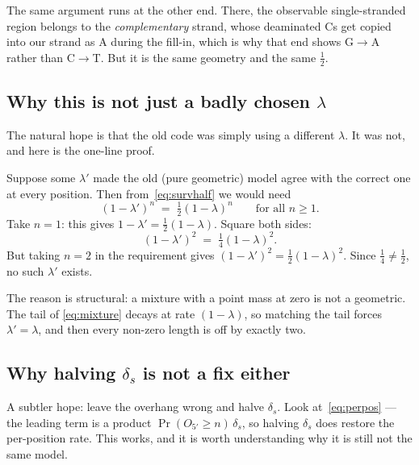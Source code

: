 \documentclass[11pt,a4paper]{article}
\newcommand{\Ol}{O_{5'}}
\begin{document}
The same argument runs at the other end. There, the observable single-stranded region
belongs to the \emph{complementary} strand, whose deaminated Cs get copied into our
strand as A during the fill-in, which is why that end shows G$\to$A rather than
C$\to$T. But it is the same geometry and the same $\tfrac12$.

\subsection{Why this is not just a badly chosen $\lambda$}

The natural hope is that the old code was simply using a different $\lambda$. It was
not, and here is the one-line proof.

Suppose some $\lambda'$ made the old (pure geometric) model agree with the correct one
at every position. Then from~\eqref{eq:survhalf} we would need
\begin{equation}
(1-\lambda')^n \;=\; \tfrac12 (1-\lambda)^n \qquad \text{for all } n \geq 1 .
\end{equation}
Take $n = 1$: this gives $1 - \lambda' = \tfrac12 (1-\lambda)$. Square both sides:
\begin{equation}
(1-\lambda')^2 \;=\; \tfrac14 (1-\lambda)^2 .
\end{equation}
But taking $n = 2$ in the requirement gives $(1-\lambda')^2 = \tfrac12 (1-\lambda)^2$.
Since $\tfrac14 \neq \tfrac12$, no such $\lambda'$ exists.

The reason is structural: a mixture with a point mass at zero is not a geometric. The
tail of \eqref{eq:mixture} decays at rate $(1-\lambda)$, so matching the tail forces
$\lambda' = \lambda$, and then every non-zero length is off by exactly two.

\subsection{Why halving $\delta_s$ is not a fix either}

A subtler hope: leave the overhang wrong and halve $\delta_s$. Look
at~\eqref{eq:perpos} --- the leading term is a product $\Pr(\Ol \geq n)\,\delta_s$,
so halving $\delta_s$ does restore the per-position rate. This works, and it is worth
understanding why it is still not the same model.
\end{document}
